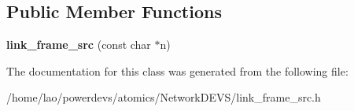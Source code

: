 \subsection*{Public Member Functions}
\begin{DoxyCompactItemize}
\item 
{\bfseries link\+\_\+frame\+\_\+src} (const char $\ast$n)\hypertarget{classlink__frame__src_a00b6c188c3a83d67f80bcf1a227c230c}{}\label{classlink__frame__src_a00b6c188c3a83d67f80bcf1a227c230c}

\end{DoxyCompactItemize}


The documentation for this class was generated from the following file\+:\begin{DoxyCompactItemize}
\item 
/home/lao/powerdevs/atomics/\+Network\+D\+E\+V\+S/link\+\_\+frame\+\_\+src.\+h\end{DoxyCompactItemize}
